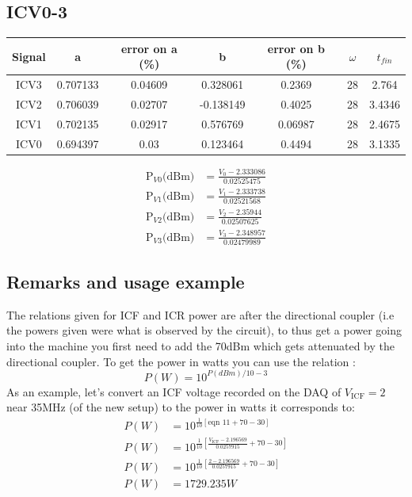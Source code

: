 \documentclass{report}
\begin{document}
\subsection{ICV0-3}
\begin{tabular}{||c c c c c c c||}
 \hline
 Signal & a & error on a (\%) & b & error on b (\%) & $\omega$ & $t_{fin}$\\ [0.5ex]
 \hline\hline
 ICV3 & 0.707133&  0.04609 & 0.328061 & 0.2369 & 28 & 2.764\\
 ICV2& 0.706039&  0.02707 & -0.138149 & 0.4025 & 28 & 3.4346\\
 ICV1& 0.702135&  0.02917 & 0.576769 & 0.06987 & 28 & 2.4675\\
 ICV0& 0.694397&  0.03 & 0.123464 & 0.4494 & 28 & 3.1335\\
 \hline
\end{tabular}
\begin{eqnarray}
    \text{P}_{V0}\text{(dBm)} &= \frac{V_{\text{0}}-2.333086}{0.02525475}\\
    \text{P}_{V1}\text{(dBm)} &= \frac{V_{\text{1}}-2.333738}{0.02521568}\\
    \text{P}_{V2}\text{(dBm)} &= \frac{V_{\text{2}}-2.35944}{0.02507625}\\
    \text{P}_{V3}\text{(dBm)} &= \frac{V_{\text{3}}-2.348957}{0.02479989}
\end{eqnarray}
\subsection{Remarks and usage example}
The relations given for ICF and ICR power are after the directional coupler
(i.e the powers given were what is observed by the circuit), to thus get a
power going into the machine you first need to add the 70dBm which gets
attenuated by the directional coupler. To get the power in watts you can use
the relation :
\begin{equation}
    P(W) = 10^{P(dBm)/10 - 3}
\end{equation}
As an example, let's convert an ICF voltage recorded on the DAQ of
$V_{\text{ICF}}=2$ near 35MHz (of the new setup) to the power in watts it
corresponds to:
\begin{eqnarray}
    P(W) &= 10^{\frac{1}{10}\left[        \text{eqn 11}+ 70 - 30\right]}\\
    P(W) &= 10^{\frac{1}{10}\left[\frac{V_{\text{ICF}}-2.196569}{0.0257915} + 70 - 30\right]}\\
    P(W) &= 10^{\frac{1}{10}\left[\frac{2-2.196569}{0.0257915} + 70 - 30\right]}\\
    P(W) &= 1729.235W
\end{eqnarray}
\newpage
\end{document}
